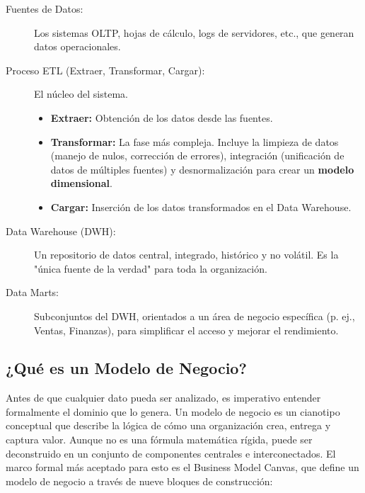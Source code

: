 \documentclass{article}
\begin{document}
\begin{description}
    \item[Fuentes de Datos:] Los sistemas OLTP, hojas de cálculo, logs de servidores, etc., que generan datos operacionales.
    \item[Proceso ETL (Extraer, Transformar, Cargar):] El núcleo del sistema.
    \begin{itemize}
        \item \textbf{Extraer:} Obtención de los datos desde las fuentes.
        \item \textbf{Transformar:} La fase más compleja. Incluye la limpieza de datos (manejo de nulos, corrección de errores), integración (unificación de datos de múltiples fuentes) y desnormalización para crear un \textbf{modelo dimensional}.
        \item \textbf{Cargar:} Inserción de los datos transformados en el Data Warehouse.
    \end{itemize}
    \item[Data Warehouse (DWH):] Un repositorio de datos central, integrado, histórico y no volátil. Es la "única fuente de la verdad" para toda la organización.
    \item[Data Marts:] Subconjuntos del DWH, orientados a un área de negocio específica (p. ej., Ventas, Finanzas), para simplificar el acceso y mejorar el rendimiento.
\end{description}

\subsection{¿Qué es un Modelo de Negocio?}
Antes de que cualquier dato pueda ser analizado, es imperativo entender formalmente el dominio que lo genera. Un modelo de negocio es un cianotipo conceptual que describe la lógica de cómo una organización crea, entrega y captura valor. Aunque no es una fórmula matemática rígida, puede ser deconstruido en un conjunto de componentes centrales e interconectados. El marco formal más aceptado para esto es el Business Model Canvas, que define un modelo de negocio a través de nueve bloques de construcción:
\end{document}
